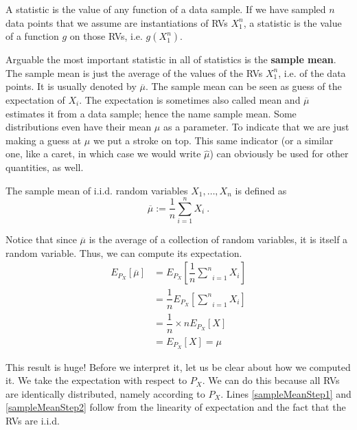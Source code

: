 \begin{Definition}
A statistic is the value of any function of a data sample. If we have sampled $ n $ data points that we assume are instantiations of RVs
$ X_{1}^{n} $, a statistic is the value of a function $ g $ on those RVs, i.e. $ g(X_{1}^{n}) $.
\end{Definition}

Arguable the most important statistic in all of statistics is the \textbf{sample mean}. The sample mean is just the average of the
values of the RVs $ X_{1}^{n} $, i.e. of the data points. It is usually denoted by $ \overline{\mu} $. The
sample mean can be seen as guess of the expectation of $ X_{i} $. The expectation is sometimes also
called mean and $ \overline{\mu} $ estimates it from a data sample; hence the name sample mean. Some distributions even have their
mean $ \mu $ as a parameter. To indicate that we are just making a guess at $ \mu $ we put a stroke on top.
This same indicator (or a similar one, like a caret, in which case we would write $ \hat{\mu} $) can obviously be used for other quantities, as well.

\begin{Definition}
The sample mean of i.i.d. random variables $ X_{1}, \ldots, X_{n} $ is defined as 
$$ \overline{\mu} := \dfrac{1}{n}\underset{i=1}{\overset{n}{\sum}} X_{i} \ . $$
\end{Definition}

Notice that since $ \overline{\mu} $ is the average of a collection of random variables, it is itself a random variable. Thus, we can
compute its expectation.
\begin{align}
E_{P_{X}}[\overline{\mu}] &= E_{P_{X}}\left[\dfrac{1}{n} \underset{i=1}{\overset{n}{\sum}} X_{i}\right] \label{eq:sampleMeanBegin} \\
&= \dfrac{1}{n} E_{P_{X}}\left[\underset{i=1}{\overset{n}{\sum}} X_{i}\right] \label{sampleMeanStep1} \\
&= \dfrac{1}{n} \times n E_{P_{X}}[X] \label{sampleMeanStep2} \\
&= E_{P_{X}}[X] = \mu \label{eq:sampleMeanEnd}
\end{align}

This result is huge! Before we interpret it, let us be clear about how we computed it. We take the expectation with respect to
$ P_{X} $. We can do this because all RVs are identically distributed, namely according to $ P_{X} $. Lines \ref{sampleMeanStep1} and
\ref{sampleMeanStep2} follow from the linearity of expectation and the fact that the RVs are i.i.d. 

